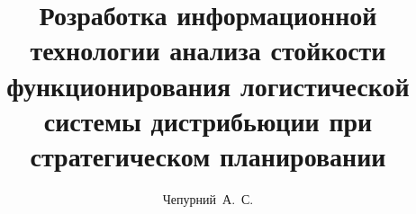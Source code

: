 \title{Розработка информационной технологии анализа стойкости функционирования логистической системы дистрибьюции при стратегическом планировании}
\author{Чепурний~А.~С.}